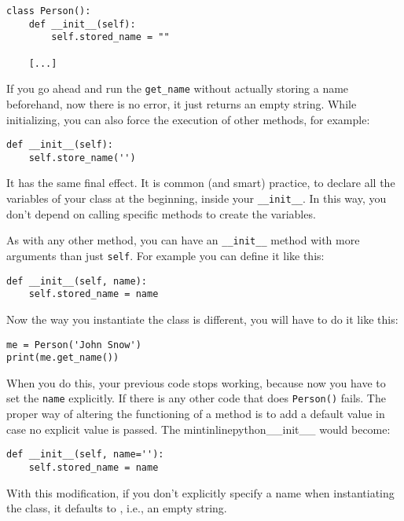 \begin{verbatim}
class Person():
    def __init__(self):
        self.stored_name = ""

    [...]
\end{verbatim}

If you go ahead and run the \texttt{get_name} without actually storing a name beforehand, now there is no error, it just returns an empty string. While initializing, you can also force the execution of other methods, for example:

\begin{verbatim}
def __init__(self):
    self.store_name('')
\end{verbatim}

It has the same final effect. It is common (and smart) practice, to declare all the variables of your class at the beginning, inside your \texttt{__init__}. In this way, you don't depend on calling specific methods to create the variables.

As with any other method, you can have an \texttt{__init__} method with more arguments than just \texttt{self}. For example you can define it like this:

\begin{verbatim}
def __init__(self, name):
    self.stored_name = name
\end{verbatim}

Now the way you instantiate the class is different, you will have to do it like this:

\begin{verbatim}
me = Person('John Snow')
print(me.get_name())
\end{verbatim}

When you do this, your previous code stops working, because now you have to set the \texttt{name} explicitly. If there is any other code that does \texttt{Person()} fails. The proper way of altering the functioning of a method is to add a default value in case no explicit value is passed. The  mintinline{python}{__init__} would become:

\begin{verbatim}
def __init__(self, name=''):
    self.stored_name = name
\end{verbatim}

With this modification, if you don't explicitly specify a name when instantiating the class, it defaults to , i.e., an empty string.

